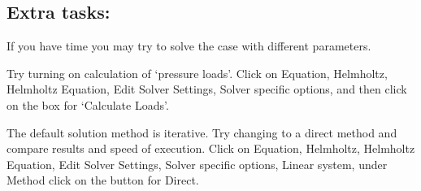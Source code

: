 \subsection*{Extra tasks:}

If you have time you may try to solve the case with different parameters.

Try turning on calculation of `pressure loads'.  Click on Equation, Helmholtz,
Helmholtz Equation, Edit Solver Settings, Solver specific options, and then
click on the box for `Calculate Loads'.

The default solution method is iterative.  Try changing to a direct method
and compare results and speed of execution.  Click on Equation, Helmholtz,
Helmholtz Equation, Edit Solver Settings, Solver specific options, Linear system,
under Method click on the button for Direct.


\hfill
